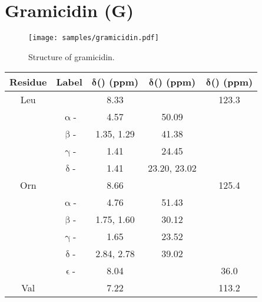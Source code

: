 \clearpage

\section{Gramicidin (G)}

\begin{figure}[!ht]
    \centering
    \texttt{[image: samples/gramicidin.pdf]}%
    \caption[Structure of gramicidin]{
        Structure of gramicidin.
    }
    \label{fig:samples_gramicidin}
\end{figure}

\begin{table}[!ht]
    \begin{tabular}{ccSSS}
        \toprule
        \textbf{Residue} & \textbf{Label} & {$\symbf{\delta}$\textbf{(\proton{}) (ppm)}} & {$\symbf{\delta}$\textbf{(\carbon{}) (ppm)}} & {$\symbf{\delta}$\textbf{(\nitrogen{}) (ppm)}} \\
        \midrule
        Leu            &                   & 8.33         &                & 123.3 \\
                       & $\upalpha$-       & 4.57         & 50.09          &       \\
                       & $\upbeta$-       & {1.35, 1.29} & 41.38          &       \\
                       & $\upgamma$-       & 1.41         & 24.45          &       \\
                       & $\updelta$-      & 1.41         & {23.20, 23.02} &       \\
        \midrule
        Orn            &                   & 8.66         &                & 125.4 \\
                       & $\upalpha$-       & 4.76         & 51.43          &       \\
                       & $\upbeta$-       & {1.75, 1.60} & 30.12          &       \\
                       & $\upgamma$-      & 1.65         & 23.52          &       \\
                       & $\updelta$-      & {2.84, 2.78} & 39.02          &       \\
                       & $\upvarepsilon$- & 8.04         &                & 36.0  \\
        \midrule
        Val            &                   & 7.22         &                & 113.2 \\

\end{tabular}
\end{table}
